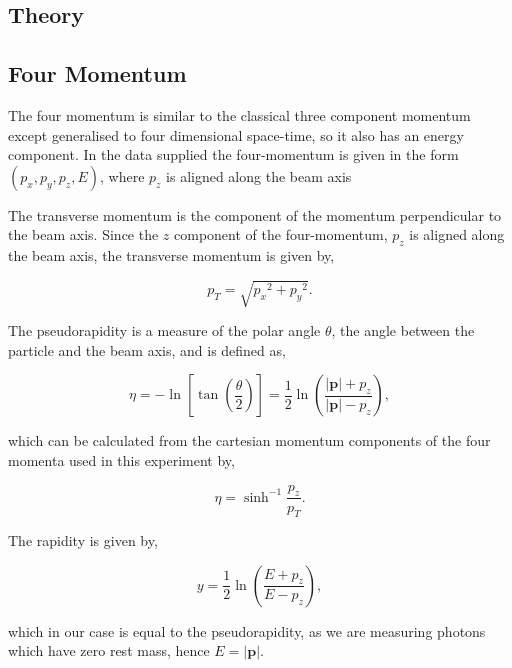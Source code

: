 \documentclass[11pt]{amsart}
\begin{document}
\begin{multicols}{2}
\section{Theory}

\subsection{Four Momentum}
\label{sec:fourmomentum}

The four momentum is similar to the classical three component momentum except generalised to four dimensional space-time, so it also has an energy component. \cite{kinematics} In the data supplied the four-momentum is given in the form $(p_x, p_y, p_z, E)$, where $p_z$ is aligned along the beam axis

The transverse momentum is the component of the momentum perpendicular to the beam axis. Since the $z$ component of the four-momentum, $p_z$ is aligned along the beam axis, the transverse momentum is given by,

\begin{equation}
  \label{eq:transverse}
  p_T = \sqrt{{p_x}^2 + {p_y}^2}.
\end{equation}

The pseudorapidity is a measure of the polar angle $\theta$, the angle between the particle and the beam axis, and is defined as,

\begin{equation}
  \label{eq:pseudorapdity2}
  \eta = -\ln{\left[\tan{\left(\frac{\theta}{2}\right)}\right]} = \frac{1}{2}\ln{\left(\frac{|\mathbf{p}|+p_z}{|\mathbf{p}|-p_z}\right)},
\end{equation}

\cite{kinematics}

which can be calculated from the cartesian momentum components of the four momenta used in this experiment by,

\begin{equation}
  \label{eq:pseudorapidity}
  \eta = \sinh^{-1} \frac{p_z}{p_T}.
\end{equation}

The rapidity is given by,

\begin{equation}
  \label{eq:rapidity}
  y = \frac{1}{2}\ln{\left(\frac{E + p_z}{E - p_z}\right)},
\end{equation}

which in our case is equal to the pseudorapidity, as we are measuring photons which have zero rest mass, hence $E = |\mathbf{p}|$.


\end{multicols}
\end{document}

